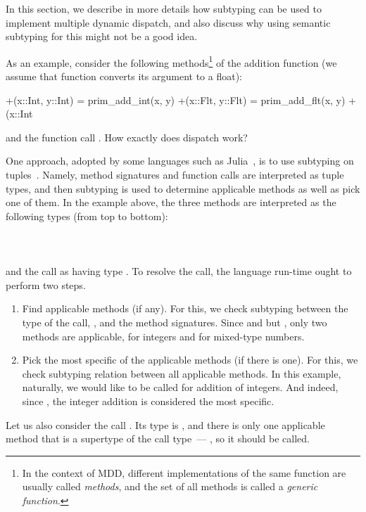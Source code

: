 In this section, we describe in more details how subtyping
can be used to implement multiple dynamic dispatch,
and also discuss why using semantic subtyping for this
might not be a good idea.

As an example, consider the following methods\footnote{In the context of MDD, 
	different implementations of 
	the same function are usually called \emph{methods},
	and the set of all methods is called a \emph{generic function}.}
of the addition function (we assume that function  
converts its argument to a float):
\begin{lstminijl}
+(x::Int, y::Int) = prim_add_int(x, y) 
+(x::Flt, y::Flt) = prim_add_flt(x, y) 
+(x::Int%
\end{lstminijl}
and the function call .
How exactly does dispatch work?

One approach, adopted by some languages
such as Julia~\cite{Bezanson2015AbstractionIT}, 
is to use subtyping on tuples~\cite{bib:Leavens:1998:mddtuples}.
Namely, method signatures and function calls are interpreted as tuple types,
and then subtyping is used to determine applicable methods 
as well as pick one of them.
In the example above, the three methods are interpreted 
as the following types (from top to bottom):\\
\\
\\
\\
and the call as having type .
To resolve the call, the language run-time ought to perform two steps.
\begin{enumerate}
  \item Find applicable methods (if any). For this, we check subtyping between
    the type of the call, , and the method signatures.
    Since  and  but
    , only two methods are applicable,
     for integers and  for mixed-type numbers.
  \item Pick the most specific of the applicable methods
    (if there is one).
    For this, we check subtyping relation between all applicable methods.
    In this example, naturally, we would like  to be called
    for addition of integers. And indeed, since ,
    the integer addition is considered the most specific.
\end{enumerate}
Let us also consider the call . Its type is
, and there is only one applicable method that is
a supertype of the call type~--- , so it should be called.

